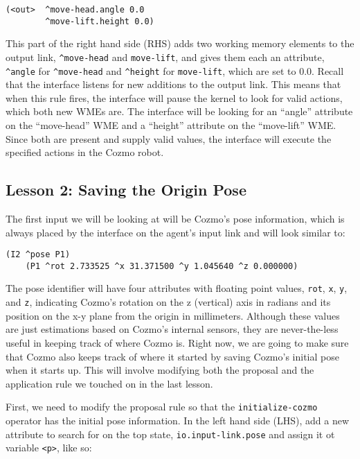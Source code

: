 \begin{verbatim}
(<out>  ^move-head.angle 0.0
        ^move-lift.height 0.0)
\end{verbatim}

This part of the right hand side (RHS) adds two working memory elements
to the output link, \texttt{\^{}move-head} and \texttt{move-lift}, and
gives them each an attribute, \texttt{\^{}angle} for
\texttt{\^{}move-head} and \texttt{\^{}height} for \texttt{move-lift},
which are set to 0.0. Recall that the interface listens for new
additions to the output link. This means that when this rule fires, the
interface will pause the kernel to look for valid actions, which both
new WMEs are. The interface will be looking for an ``angle'' attribute
on the ``move-head'' WME and a ``height'' attribute on the ``move-lift''
WME. Since both are present and supply valid values, the interface will
execute the specified actions in the Cozmo robot.

\hypertarget{lesson-2-saving-the-origin-pose}{%
\subsection{Lesson 2: Saving the Origin
Pose}\label{lesson-2-saving-the-origin-pose}}

The first input we will be looking at will be Cozmo's pose information,
which is always placed by the interface on the agent's input link and
will look similar to:

\begin{verbatim}
(I2 ^pose P1)
    (P1 ^rot 2.733525 ^x 31.371500 ^y 1.045640 ^z 0.000000)
\end{verbatim}

The pose identifier will have four attributes with floating point
values, \texttt{rot}, \texttt{x}, \texttt{y}, and \texttt{z}, indicating
Cozmo's rotation on the z (vertical) axis in radians and its position on
the x-y plane from the origin in millimeters. Although these values are
just estimations based on Cozmo's internal sensors, they are
never-the-less useful in keeping track of where Cozmo is. Right now, we
are going to make sure that Cozmo also keeps track of where it started
by saving Cozmo's initial pose when it starts up. This will involve
modifying both the proposal and the application rule we touched on in
the last lesson.

First, we need to modify the proposal rule so that the
\texttt{initialize-cozmo} operator has the initial pose information. In
the left hand side (LHS), add a new attribute to search for on the top
state, \texttt{io.input-link.pose} and assign it ot variable
\texttt{\textless{}p\textgreater{}}, like so:

